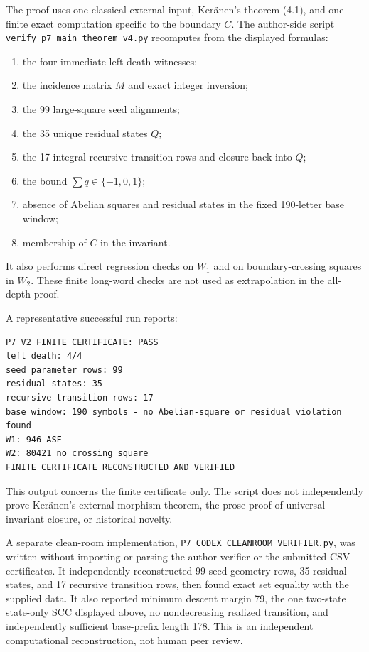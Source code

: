 \documentclass[11pt]{article}
\theoremstyle{definition}
\newcommand{\code}[1]{\texttt{#1}}
\begin{document}
The proof uses one classical external input, Ker\"anen's theorem (4.1), and one finite exact computation specific to the boundary $C$. The author-side script \code{verify\_p7\_main\_theorem\_v4.py} recomputes from the displayed formulas:
\begin{enumerate}
\item the four immediate left-death witnesses;
\item the incidence matrix $M$ and exact integer inversion;
\item the 99 large-square seed alignments;
\item the 35 unique residual states $Q$;
\item the 17 integral recursive transition rows and closure back into $Q$;
\item the bound $\sum q\in\{-1,0,1\}$;
\item absence of Abelian squares and residual states in the fixed 190-letter base window;
\item membership of $C$ in the invariant.
\end{enumerate}
It also performs direct regression checks on $W_1$ and on boundary-crossing squares in $W_2$. These finite long-word checks are not used as extrapolation in the all-depth proof.

A representative successful run reports:
\begin{verbatim}
P7 V2 FINITE CERTIFICATE: PASS
left death: 4/4
seed parameter rows: 99
residual states: 35
recursive transition rows: 17
base window: 190 symbols - no Abelian-square or residual violation found
W1: 946 ASF
W2: 80421 no crossing square
FINITE CERTIFICATE RECONSTRUCTED AND VERIFIED
\end{verbatim}
This output concerns the finite certificate only. The script does not independently prove Ker\"anen's external morphism theorem, the prose proof of universal invariant closure, or historical novelty.

A separate clean-room implementation, \code{P7\_CODEX\_CLEANROOM\_VERIFIER.py}, was written without importing or parsing the author verifier or the submitted CSV certificates. It independently reconstructed 99 seed geometry rows, 35 residual states, and 17 recursive transition rows, then found exact set equality with the supplied data. It also reported minimum descent margin 79, the one two-state state-only SCC displayed above, no nondecreasing realized transition, and independently sufficient base-prefix length 178. This is an independent computational reconstruction, not human peer review.
\end{document}
